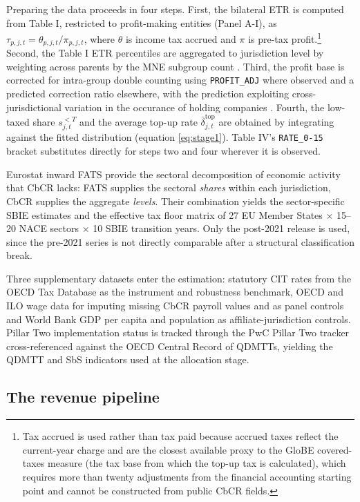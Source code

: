 \documentclass[11pt,a4paper]{article}
\newcommand{\code}[1]{\texttt{#1}}
\begin{document}
Preparing the data proceeds in four steps. First, the bilateral ETR is computed from Table I, restricted to profit-making entities (Panel A-I), as $\tau_{p,j,t} = \theta_{p,j,t}/\pi_{p,j,t}$, where $\theta$ is income tax accrued and $\pi$ is pre-tax profit.\footnote{Tax accrued is used rather than tax paid because accrued taxes reflect the current-year charge and are the closest available proxy to the GloBE covered-taxes measure (the tax base from which the top-up tax is calculated), which requires more than twenty adjustments from the financial accounting starting point \citep{hanlon2023} and cannot be constructed from public CbCR fields.} Second, the Table I ETR percentiles are aggregated to jurisdiction level by weighting across parents by the MNE subgroup count \citep{hugger2026}. Third, the profit base is corrected for intra-group double counting using \code{PROFIT\_ADJ} where observed and a predicted correction ratio elsewhere, with the prediction exploiting cross-jurisdictional variation in the occurance of holding companies \citep{blouin2023,garcia-bernardo2022a}. Fourth, the low-taxed share $s_{j,t}^{<T}$ and the average top-up rate $\bar{\delta}_{j,t}^{\text{top}}$ are obtained by integrating against the fitted distribution (equation \ref{eq:stage1}). Table IV's \code{RATE\_0-15} bracket substitutes directly for steps two and four wherever it is observed.

Eurostat inward FATS provide the sectoral decomposition of economic activity that CbCR lacks: FATS supplies the sectoral \emph{shares} within each jurisdiction, CbCR supplies the aggregate \emph{levels}. Their combination yields the sector-specific SBIE estimates and the effective tax floor matrix of 27 EU Member States $\times$ 15--20 NACE sectors $\times$ 10 SBIE transition years. Only the post-2021 release is used, since the pre-2021 series is not directly comparable after a structural classification break.

Three supplementary datasets enter the estimation: statutory CIT rates from the OECD Tax Database as the instrument and robustness benchmark, OECD and ILO wage data for imputing missing CbCR payroll values and as panel controls and World Bank GDP per capita and population as affiliate-jurisdiction controls. Pillar Two implementation status is tracked through the PwC Pillar Two tracker cross-referenced against the OECD Central Record of QDMTTs, yielding the QDMTT and SbS indicators used at the allocation stage.

\subsection{The revenue pipeline}\label{sec:pipeline}
\end{document}
